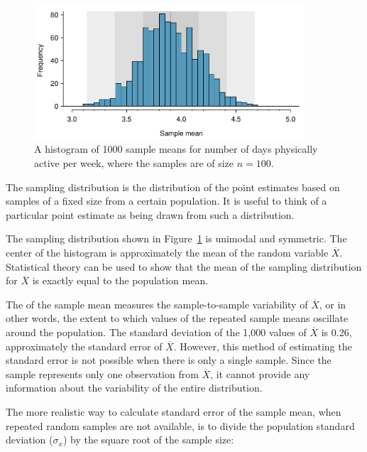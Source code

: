 \begin{spacing}{1.5}
\begin{figure}[h]
   \centering
   \includegraphics[width=0.9\textwidth]
{ch_inference_foundations_oi_biostat/figures/yrbssActive1000SampDist/yrbssActive1000SampDist}
   \caption{A histogram of 1000 sample means for number of days physically active per week, where the samples are of size $n=100$.}
   \label{yrbssActive1000SampDist}
\end{figure}

\begin{termBox}{
The sampling distribution is the distribution of the point estimates based on samples of a fixed size from a certain population. It is useful to think of a particular point estimate as being drawn from such a distribution.}
\end{termBox}

The sampling distribution shown in Figure~\ref{yrbssActive1000SampDist} is unimodal and symmetric. The center of the histogram is approximately the mean of the random variable $\overline{X}$. Statistical theory can be used to show that the mean of the sampling distribution for $\overline{X}$ is exactly equal to the population mean. 

The  of the sample mean measures the sample-to-sample variability of $\overline{X}$, or in other words, the extent to which values of the repeated sample means oscillate around the population. The standard deviation of the 1,000 values of $\overline{X}$ is 0.26, approximately the standard error of $\overline{X}$. However, this method of estimating the standard error is not possible when there is only a single sample. Since the sample represents only one observation from $\overline{X}$, it cannot provide any information about the variability of the entire distribution.

The more realistic way to calculate standard error of the sample mean, when repeated random samples are not available, is to divide the population standard deviation ($\sigma_{x}$) by the square root of the sample size:


\end{spacing}
